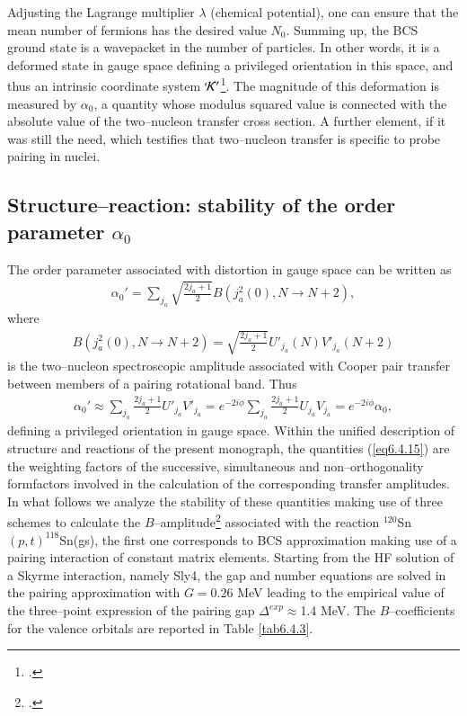 Adjusting the Lagrange multiplier $\lambda$ (chemical potential), one can ensure that the mean number of fermions has the desired value $N_0$.
Summing up, the BCS ground state is a wavepacket in the number of particles. In other words, it is a deformed state in gauge space  defining a privileged 
orientation in this space, and thus an intrinsic coordinate system ${\cal K'}$\footnote{\cite{Anderson:58, Bohr:64,Bes:66}.}.
The magnitude of this deformation is measured by $\alpha_0$, a quantity whose modulus squared value is connected with the absolute value of the two--nucleon transfer cross section. A further element, if it was still the need, which testifies that two--nucleon transfer is specific to probe pairing in nuclei.
\subsection{Structure--reaction: stability of the order parameter $\alpha_0$}\label{C6S2.3}
The order parameter associated with distortion in gauge space can be written as 
\begin{align}
\alpha_0'=\sum_{j_a}\sqrt{\frac{2j_a+1}{2}}B(j^2_a(0),N\to N+2),
\end{align}
where
\begin{align}\label{eq6.4.15x}
B(j^2_a(0),N\to N+2)=\sqrt{\frac{2j_a+1}{2}}U'_{j_a}(N)V'_{j_a}(N+2)
\end{align}
is the two--nucleon spectroscopic amplitude associated with Cooper pair transfer between members of a pairing rotational band. Thus 
\begin{align}\label{eq6.4.15}
\alpha_0'\approx\sum_{j_a}\frac{2j_a+1}{2}U'_{j_a}V'_{j_a}=e^{-2i\phi}\sum_{j_a}\frac{2j_a+1}{2}U_{j_a}V_{j_a}=e^{-2i\phi}\alpha_0,
\end{align}
defining a privileged orientation in gauge space. Within the unified description of structure and reactions of the present monograph, the quantities (\ref{eq6.4.15}) are the weighting factors of the successive, simultaneous and non--orthogonality formfactors involved in the calculation of the corresponding transfer amplitudes. In what follows we analyze the stability of these quantities making use of three schemes to calculate the $B$--amplitude\footnote{\cite{Potel:17}.} associated with the reaction $^{120}$Sn$(p,t)^{118}$Sn(gs), the first one corresponds to BCS approximation making use of a pairing interaction of constant matrix elements.  Starting from the HF solution of a Skyrme interaction, namely Sly4, the gap and number equations are solved in the pairing approximation with $G=0.26$ MeV leading to the empirical value of the three--point expression of the pairing gap $\Delta^{exp}\approx$1.4 MeV. The $B$--coefficients for the valence orbitals are reported in Table \ref{tab6.4.3}. 


